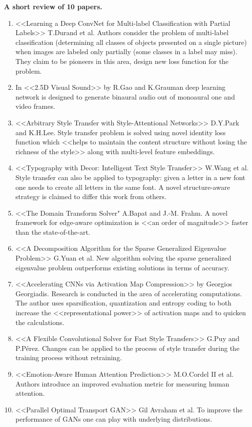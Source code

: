 \documentclass{article}
\begin{document}
{\bfseries A short review of 10 papers.}
\begin{enumerate}
	\item <<Learning a Deep ConvNet for Multi-label Classification with Partial Labels>> T.Durand et al. Authors consider the problem of multi-label classification (determining all classes of objects presented on a single picture) when images are labeled only partially (some classes in a label may miss). They claim to be pioneers in this area, design new loss function for the problem.
 	\item In <<2.5D Visual Sound>> by R.Gao and K.Grauman deep learning network is designed to generate binaural audio out of monoaural one and video frames.
	\item <<Arbitrary Style Transfer with Style-Attentional Networks>> D.Y.Park and K.H.Lee. Style transfer problem is solved using novel identity loss function which <<helps to maintain the content structure without losing the richness of the style>> along with multi-level feature embeddings.
	\item <<Typography with Decor: Intelligent Text Style Transfer>> W.Wang et al. Style transfer can also be applied to typography: given a letter in a new font one needs to create all letters in the same font. A novel structure-aware strategy is claimed to differ this work from others.
	\item <<The Domain Transform Solver" A.Bapat and J.-M. Frahm. A novel framework for edge-aware optimization is <<an order of magnitude>> faster than the state-of-the-art. 
	\item <<A Decomposition Algorithm for the Sparse Generalized Eigenvalue Problem>> G.Yuan et al. New algorithm solving the sparse generalized eigenvalue problem outperforms existing solutions in terms of accuracy.
	\item <<Accelerating CNNs via Activation Map Compression>> by Georgios Georgiadis. Research is conducted in the area of accelerating computations. The author uses sparsification, quantization and entropy coding to both increase the <<representational power>> of activation maps and to quicken the calculations. 
	\item <<A Flexible Convolutional Solver for Fast Style Transfers>> G.Puy and P.P{\'e}rez. Changes can be applied to the process of style transfer during the training process without retraining.
	\item <<Emotion-Aware Human Attention Prediction>> M.O.Cordel II et al. Authors introduce an improved evaluation metric for measuring human attention.
	\item <<Parallel Optimal Transport GAN>> Gil Avraham et al. To improve the performance of GANs one can play with underlying distributions. 
	\end{enumerate}
\end{document}

